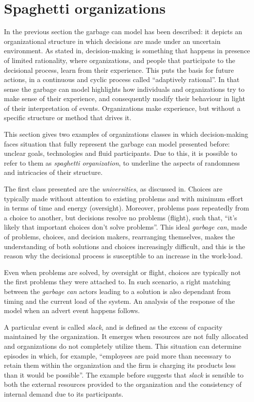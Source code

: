 \section{Spaghetti organizations}
In the previous section the garbage can model has been described: it depicts an organizational structure in which decisions are made under an uncertain environment. As stated in\cite{4}, decision-making is something that happens in presence of limited rationality, where organizations, and people that participate to the decisional process, learn from their experience. This puts the basis for future actions, in a continuous and cyclic process called ``adaptively rational''. In that sense the garbage can model highlights how individuals and organizations try to make sense of their experience, and consequently modify their behaviour in light of their interpretation of events. Organizations make experience, but without a specific structure or method that drives it.

This section gives two examples of organizations classes in which decision-making faces situation that fully represent the garbage can model presented before: unclear goals, technologies and fluid participants. Due to this, it is possible to refer to them as \textit{spaghetti organization}, to underline the aspects of randomness and intricacies of their structure.

The first class presented are the \textit{universities}, as discussed in\cite{1}. Choices are typically made without attention to existing problems and with minimum effort in terms of time and energy (oversight). Moreover, problems pass repeatedly from a choice to another, but decisions resolve no problems (flight), such that, ``it’s likely that important choices don’t solve problems''. This ideal \textit{garbage can}, made of problems, choices, and decision makers, rearranging themselves, makes the understanding of both solutions and choices increasingly difficult, and this is the reason why the decisional process is susceptible to an increase in the work-load.

Even when problems are solved, by oversight or flight, choices are typically not the first problems they were attached to. In such scenario, a right matching between the \textit{garbage can} actors leading to a solution is also dependant from timing and the current load of the system.
An analysis of the response of the model when an advert event happens follows.

A particular event is called \textit{slack}, and is defined as the excess of capacity maintained by the organization. It emerges when resources are not fully allocated and organizations do not completely utilize them. This situation can determine episodes in which, for example, ``employees are paid more than necessary to retain them within the organization and the firm is charging its products less than it would be possible''\cite{13}. The example before suggests that \textit{slack} is sensible to both the external resources provided to the organization and the consistency of internal demand due to its participants.


